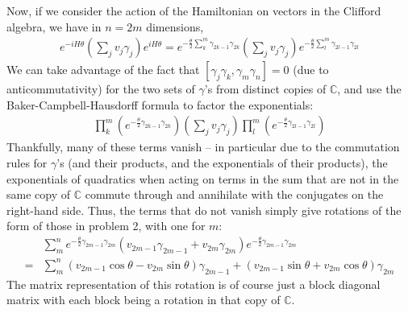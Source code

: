 \documentclass{../mathnotes}
\begin{document}
Now, if we consider the action of the Hamiltonian on vectors in the Clifford algebra, we have in $n=2m$ dimensions,
\begin{align*}
    e^{-iH\theta}\left(\sum_jv_j\gamma_j\right)e^{iH\theta}=e^{-\frac{\theta}{2}\sum_k^m \gamma_{2k-1}\gamma_{2k}}\left(\sum_jv_j\gamma_j\right)e^{-\frac{\theta}{2}\sum_l^m \gamma_{2l-1}\gamma_{2l}}
\end{align*}
We can take advantage of the fact that $[\gamma_j\gamma_k,\gamma_m\gamma_n]=0$ (due to anticommutativity) for the two sets of $\gamma$'s from distinct copies of $\mathbb{C}$,
and use the Baker-Campbell-Hausdorff formula to factor the exponentials:
\begin{align*}
   \prod_k^m(e^{-\frac{\theta}{2}\gamma_{2k-1}\gamma_{2k}})\left(\sum_jv_j\gamma_j\right)\prod_l^m(e^{-\frac{\theta}{2}\gamma_{2l-1}\gamma_{2l}})
\end{align*}
Thankfully, many of these terms vanish -- in particular due to the commutation rules for $\gamma$'s (and their products, and the exponentials of their products),
the exponentials of quadratics when acting on terms in the sum that are not in the same copy of $\mathbb{C}$ commute through and annihilate with the conjugates
on the right-hand side. Thus, the terms that do not vanish simply give rotations of the form of those in problem 2, with one for $m$:
\begin{align*}
    &\sum_m^n e^{-\frac{\theta}{2}\gamma_{2m-1}\gamma_{2m}}(v_{2m-1}\gamma_{2m-1}+v_{2m}\gamma_{2m})e^{-\frac{\theta}{2}\gamma_{2m-1}\gamma_{2m}}\\
    =&\sum_m^n (v_{2m-1}\cos\theta-v_{2m}\sin\theta)\gamma_{2m-1}+(v_{2m-1}\sin\theta+v_{2m}\cos\theta)\gamma_{2m}
\end{align*}
The matrix representation of this rotation is of course just a block diagonal matrix with each block being a rotation in that copy of $\mathbb{C}$.
\end{document}
